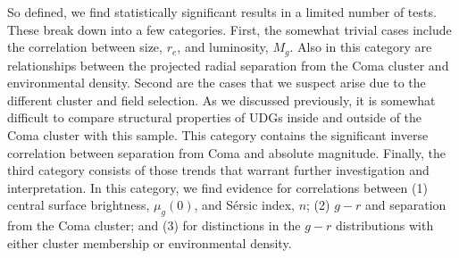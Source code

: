 \documentclass[twocolumn,tighten]{aastex63}
\begin{document}
So defined, we find  statistically significant results in a limited number of tests. These break down into a few categories. First, the somewhat trivial cases include the correlation between size,  $r_e$, and luminosity, $M_g$. Also in this category are relationships between the projected radial separation from the Coma cluster and environmental density. 
Second are the cases that we suspect arise due to the different cluster and field selection. As we discussed previously, it is somewhat difficult to compare structural properties of UDGs inside and outside of the Coma cluster with this sample. This category contains the significant inverse correlation between separation from Coma and absolute magnitude. Finally, the third category consists of those trends that warrant further investigation and interpretation. In this category, we find evidence for correlations between
(1) central surface brightness, $\mu_g(0)$, and S\'ersic index, $n$; (2) $g-r$ and separation from the Coma cluster; and (3) for distinctions in the $g-r$ distributions with either cluster membership or environmental density. 
\end{document}
